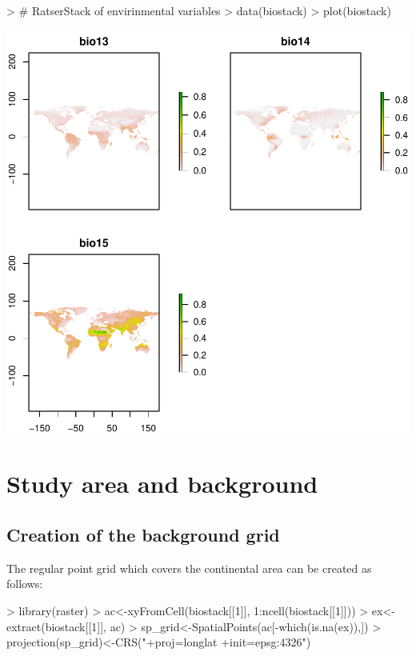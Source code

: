 \documentclass[10pt,a4paper]{report}
\begin{document}
\begin{Schunk}
\begin{Sinput}
> # RatserStack of envirinmental variables
> data(biostack)
> plot(biostack)
\end{Sinput}
\end{Schunk}
\includegraphics{mopa-mopa3}

\chapter{Study area and background}

\section{Creation of the background grid}

The regular point grid which covers the continental area can be created as follows:

\begin{Schunk}
\begin{Sinput}
> library(raster)
> ac<-xyFromCell(biostack[[1]],  1:ncell(biostack[[1]]))
> ex<-extract(biostack[[1]], ac)
> sp_grid<-SpatialPoints(ac[-which(is.na(ex)),])
> projection(sp_grid)<-CRS("+proj=longlat +init=epsg:4326")
\end{Sinput}
\end{Schunk}
\end{document}
